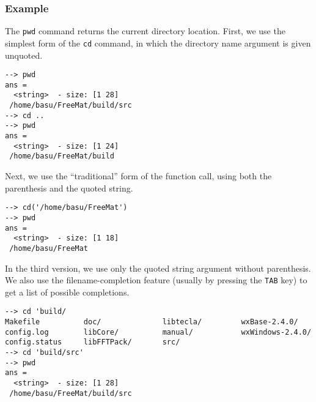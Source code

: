 \subsubsection{Example}
The \verb|pwd| command returns the current directory location.  First, we use the simplest form of the \verb|cd| command, in which the directory name argument is given unquoted.
\begin{verbatim}
--> pwd
ans =
  <string>  - size: [1 28]
 /home/basu/FreeMat/build/src
--> cd ..
--> pwd
ans =
  <string>  - size: [1 24]
 /home/basu/FreeMat/build
\end{verbatim}
Next, we use the ``traditional'' form of the function call, using both the parenthesis and the quoted string.
\begin{verbatim}
--> cd('/home/basu/FreeMat')
--> pwd
ans =
  <string>  - size: [1 18]
 /home/basu/FreeMat
\end{verbatim}
In the third version, we use only the quoted string argument without parenthesis.  We also use the filename-completion feature (usually by pressing the \verb|TAB| key) to get a list of possible completions.
\begin{verbatim}
--> cd 'build/
Makefile          doc/              libtecla/         wxBase-2.4.0/
config.log        libCore/          manual/           wxWindows-2.4.0/
config.status     libFFTPack/       src/
--> cd 'build/src'
--> pwd
ans =
  <string>  - size: [1 28]
 /home/basu/FreeMat/build/src
\end{verbatim}
